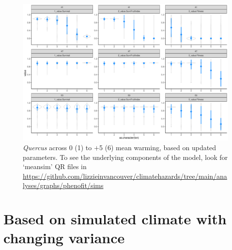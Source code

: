\documentclass[11pt,letter]{article}
\begin{document}
\begin{figure}[h!]
 \begin{center}
\noindent \includegraphics[width=1\textwidth]{..//analyses/graphs/phenofit/sims/metrics3/meansim_3metricsQR.pdf}
  \caption{\emph{Quercus} across 0 (1) to $+$5 (6) mean warming, based on updated parameters. To see the underlying components of the model, look for `meansim' QR files in \url{https://github.com/lizzieinvancouver/climatehazards/tree/main/analyses/graphs/phenofit/sims}}
  \label{fig:simsmeanUp}
  \end{center}
\end{figure}


\clearall
\section*{Based on simulated climate with changing variance}
\end{document}
